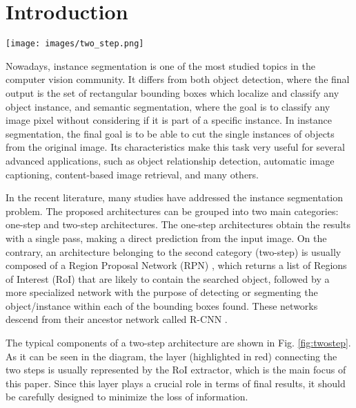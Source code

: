 \documentclass[10pt,conference,a4paper]{IEEEtran}
\begin{document}
\IEEEpeerreviewmaketitle


\section{Introduction}

\begin{figure*}[thb]
	\begin{center}
		\texttt{[image: images/two\_step.png]}
	\end{center}
	\caption{Typical components of a two-stage R-CNN-like architecture for instance segmentation.}
	\label{fig:twostep}
\end{figure*}

Nowadays, instance segmentation is one of the most studied topics in the computer vision community. It differs from both object detection, where the final output is the set of rectangular bounding boxes which localize and classify any object instance, and semantic segmentation, where the goal is to classify any image pixel without considering if it is part of a specific instance.
In instance segmentation, the final goal is to be able to cut the single instances of objects from the original image. Its characteristics make this task very useful for several advanced applications, such as object relationship detection, automatic image captioning, content-based image retrieval, and many others.

In the recent literature, many studies have addressed the instance segmentation problem. The proposed architectures can be grouped into two main categories: one-step and two-step architectures.
The one-step architectures obtain the results with a single pass, making a direct prediction from the input image. On the contrary, an architecture belonging to the second category (two-step) is usually composed of a Region Proposal Network (RPN) \cite{girshick2014rich}, which returns a list of Regions of Interest (RoI) that are likely to contain the searched object, followed by a more specialized network with the purpose of detecting or segmenting the object/instance within each of the bounding boxes found. These networks descend from their ancestor network called R-CNN \cite{girshick2014rich}.

The typical components of a two-step architecture are shown in Fig. \ref{fig:twostep}.
As it can be seen in the diagram, the layer (highlighted in red) connecting the two steps is usually represented by the RoI extractor, which is the main focus of this paper.
Since this layer plays a crucial role in terms of final results, it should be carefully designed to minimize the loss of information.
\end{document}

